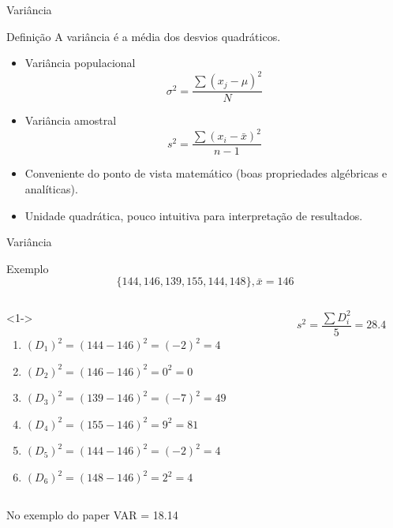 \documentclass{beamer}
\begin{document}
\begin{frame}{\scriptsize Variância}
  \begin{block}{Definição}
    A variância é a média dos desvios quadráticos.
  \end{block}
  \begin{itemize}
    \footnotesize
  \item Variância populacional
$$\sigma^2 = \frac{\sum (x_j - \mu)^2}{N}$$
\item Variância amostral
$$s^2 = \frac{\sum (x_i - \bar{x})^2}{n-1}$$
\item Conveniente do ponto de vista matemático (boas propriedades
  algébricas e analíticas).
\item Unidade quadrática, pouco intuitiva para interpretação de
  resultados.
  \end{itemize}
\end{frame}

\begin{frame}{\scriptsize Variância}
  \begin{exampleblock}{Exemplo}
    \scriptsize
      \begin{displaymath}
    \{144, 146, 139, 155, 144, 148\}, \bar{x} = 146
  \end{displaymath}
    \bigskip
    \tiny
  \begin{columns}
    \begin{column}{6cm}<1->
      \begin{enumerate}
        \tiny
      \item $(D_1)^2 = (144-146)^2 = (-2)^2 = 4$
      \item $(D_2)^2 = (146-146)^2 = 0^2 = 0$
      \item $(D_3)^2 = (139-146)^2 = (-7)^2 = 49$
      \item $(D_4)^2 = (155-146)^2 = 9^2 = 81$
      \item $(D_5)^2 = (144-146)^2 = (-2)^2 = 4$
      \item $(D_6)^2 = (148-146)^2 = 2^2 = 4$
      \end{enumerate}
    \end{column}
    \begin{column}{4cm}
      \footnotesize
      \begin{displaymath}
        s^2 = \frac{\sum D_i^2}{5} = 28.4
      \end{displaymath}
    \end{column}
  \end{columns}
  \end{exampleblock}
  \begin{block}{No exemplo do paper}
    \scriptsize
    VAR = 18.14
  \end{block}
\end{frame}
\end{document}
